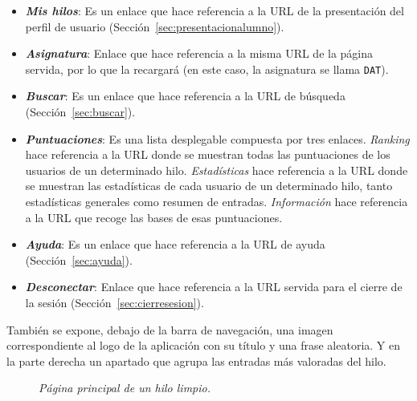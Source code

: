 \documentclass[a4paper, 12pt]{book}
\begin{document}
\begin{itemize}
  \item {\bfseries \textit{Mis hilos}}: Es un enlace que hace referencia a la URL de la presentaci\'on del perfil de usuario 
  (Secci\'on~\ref{sec:presentacionalumno}).
  \item {\bfseries \textit{Asignatura}}: Enlace que hace referencia a la misma URL de la p\'agina servida, por lo que la recargar\'a (en este caso, 
  la asignatura se llama \texttt{DAT}).
  \item {\bfseries \textit{Buscar}}: Es un enlace que hace referencia a la URL de b\'usqueda (Secci\'on~\ref{sec:buscar}).
  \item {\bfseries \textit{Puntuaciones}}: Es una lista desplegable compuesta por tres enlaces. \textit{Ranking} hace referencia a la URL donde se muestran 
  todas las puntuaciones de los usuarios de un determinado hilo. \textit{Estad\'isticas} hace referencia a la URL donde se muestran las estad\'isticas de 
  cada usuario de un determinado hilo, tanto estad\'isticas generales como resumen de entradas. \textit{Informaci\'on} hace referencia a la URL que 
  recoge las bases de esas puntuaciones.
  \item {\bfseries \textit{Ayuda}}: Es un enlace que hace referencia a la URL de ayuda (Secci\'on~\ref{sec:ayuda}).
  \item {\bfseries \textit{Desconectar}}: Enlace que hace referencia a la URL servida para el cierre de la sesi\'on (Secci\'on~\ref{sec:cierresesion}).
\end{itemize}
Tambi\'en se expone, debajo de la barra de navegaci\'on, una imagen correspondiente al logo de la aplicaci\'on con su t\'itulo y una frase aleatoria.
Y en la parte derecha un  apartado que agrupa las entradas m\'as valoradas del hilo.

\begin{figure}
  \centering
  \caption{\textit{P\'agina principal de un hilo limpio.}}
  \label{fig:hilos}
\end{figure}
\end{document}
